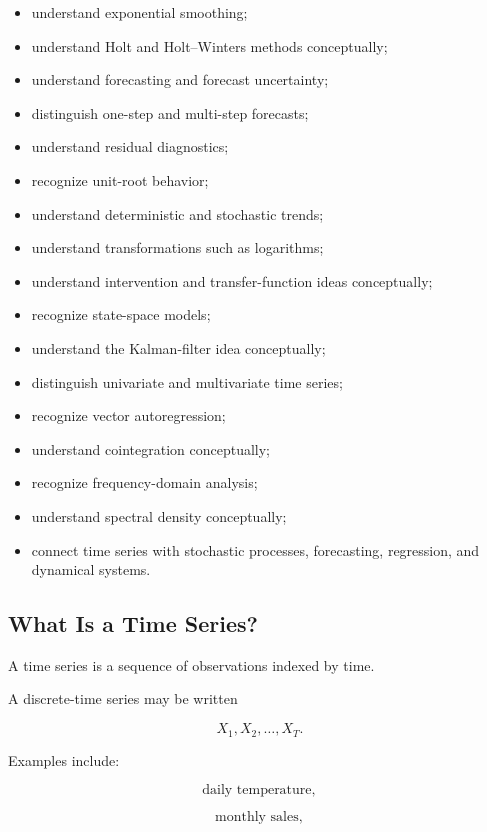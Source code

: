 {\begin{itemize}
    \item understand exponential smoothing;
    \item understand Holt and Holt--Winters methods conceptually;
    \item understand forecasting and forecast uncertainty;
    \item distinguish one-step and multi-step forecasts;
    \item understand residual diagnostics;
    \item recognize unit-root behavior;
    \item understand deterministic and stochastic trends;
    \item understand transformations such as logarithms;
    \item understand intervention and transfer-function ideas
          conceptually;
    \item recognize state-space models;
    \item understand the Kalman-filter idea conceptually;
    \item distinguish univariate and multivariate time series;
    \item recognize vector autoregression;
    \item understand cointegration conceptually;
    \item recognize frequency-domain analysis;
    \item understand spectral density conceptually;
    \item connect time series with stochastic processes, forecasting,
          regression, and dynamical systems.
\end{itemize}
}

\subsection{What Is a Time Series?}
\label{subsec:what-is-time-series}

A time series is a sequence of observations indexed by time.

A discrete-time series may be written

\[
\boxed{
X_1,
X_2,
\ldots,
X_T.
}
\]

Examples include:

\[
\boxed{
\text{daily temperature},
}
\]

\[
\boxed{
\text{monthly sales},
}
\]

